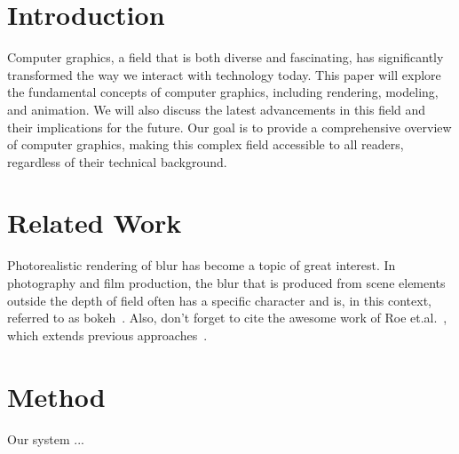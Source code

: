 \section{Introduction}

Computer graphics, a field that is both diverse and fascinating, has significantly transformed the way we interact with technology today. This paper will explore the fundamental concepts of computer graphics, including rendering, modeling, and animation. We will also discuss the latest advancements in this field and their implications for the future.
Our goal is to provide a comprehensive overview of computer graphics, making this complex field accessible to all readers, regardless of their technical background.

\section{Related Work}
Photorealistic rendering of blur has become a topic of great interest. In photography and film production, the blur that is produced from scene elements outside the depth of field often has a specific character and is, in this context, referred to as bokeh~\cite{luo2020bokeh}. Also, don't forget to cite the awesome work of Roe et.al.~\cite{roe17}, which extends previous approaches~\cite{everyman14,smith14}.


\section{Method}
Our system ...










